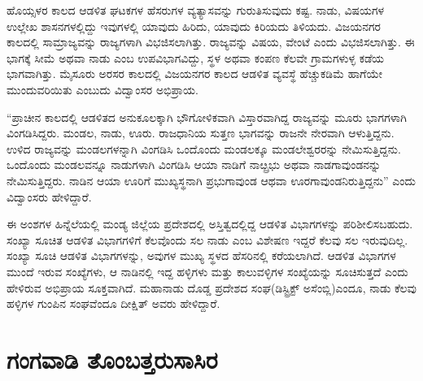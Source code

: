 ಹೊಯ್ಸಳರ ಕಾಲದ ಆಡಳಿತ ಘಟಕಗಳ ಹೆಸರುಗಳ ವ್ಯತ್ಯಾಸವನ್ನು ಗುರುತಿಸುವುದು ಕಷ್ಟ. ನಾಡು, ವಿಷಯಗಳ ಉಲ್ಲೇಖ ಶಾಸನಗಳಲ್ಲಿದ್ದು ಇವುಗಳಲ್ಲಿ ಯಾವುದು ಹಿರಿದು, ಯಾವುದು ಕಿರಿಯದು ತಿಳಿಯದು. ವಿಜಯನಗರ ಕಾಲದಲ್ಲಿ ಸಾಮ್ರಾಜ್ಯವನ್ನು ರಾಜ್ಯಗಳಾಗಿ ವಿಭಜಿಸಲಾಗಿತ್ತು. ರಾಜ್ಯವನ್ನು ವಿಷಯ, ವೇಂಟೆ ಎಂದು ವಿಭಜಿಸಲಾಗಿತ್ತು. ಈ ಭಾಗಕ್ಕೆ ಸೀಮೆ ಅಥವಾ ನಾಡು ಎಂಬ ಉಪವಿಭಾಗವಿದ್ದು, ಸ್ಥಳ ಅಥವಾ ಕಂಪಣ ಕೆಲವೇ ಗ್ರಾಮಗಳುಳ್ಳ ಕಡೆಯ ಭಾಗವಾಗಿತ್ತು. ಮೈಸೂರು ಅರಸರ ಕಾಲದಲ್ಲಿ ವಿಜಯನಗರ ಕಾಲದ ಆಡಳಿತ ವ್ಯವಸ್ಥೆ ಹೆಚ್ಚುಕಡಿಮೆ ಹಾಗೆಯೇ ಮುಂದುವರಿಯಿತು ಎಂಬುದು ವಿದ್ವಾಂಸರ ಅಭಿಪ್ರಾಯ.

“ಪ್ರಾಚೀನ ಕಾಲದಲ್ಲಿ ಆಡಳಿತದ ಅನುಕೂಲಕ್ಕಾಗಿ ಭೌಗೋಳಿಕವಾಗಿ ವಿಸ್ತಾರವಾಗಿದ್ದ ರಾಜ್ಯವನ್ನು ಮೂರು ಭಾಗಗಳಾಗಿ ವಿಂಗಡಿಸಿದ್ದರು. ಮಂಡಲ, ನಾಡು, ಊರು. ರಾಜಧಾನಿಯ ಸುತ್ತಣ ಭಾಗವನ್ನು ರಾಜನೇ ನೇರವಾಗಿ ಆಳುತ್ತಿದ್ದನು. ಉಳಿದ ರಾಜ್ಯವನ್ನು ಮಂಡಲಗಳನ್ನಾಗಿ ವಿಂಗಡಿಸಿ ಒಂದೊಂದು ಮಂಡಲಕ್ಕೂ ಮಂಡಲೇಶ್ವರರನ್ನು ನೇಮಿಸು\-ತ್ತಿದ್ದನು. ಒಂದೊಂದು ಮಂಡಲವನ್ನೂ ನಾಡುಗಳಾಗಿ ವಿಂಗಡಿಸಿ ಆಯಾ ನಾಡಿಗೆ ನಾೞ್ಪ್ರಭು ಅಥವಾ ನಾಡಗಾವುಂಡನನ್ನು ನೇಮಿಸು\-ತ್ತಿದ್ದರು. ನಾಡಿನ ಆಯಾ ಊರಿಗೆ ಮುಖ್ಯಸ್ಥನಾಗಿ ಪ್ರಭುಗಾವುಂಡ ಆಥವಾ ಊರಗಾವುಂಡನಿರುತ್ತಿದ್ದನು” ಎಂದು ವಿದ್ವಾಂಸರು ಹೇಳಿದ್ದಾರೆ.

ಈ ಅಂಶಗಳ ಹಿನ್ನೆಲೆಯಲ್ಲಿ ಮಂಡ್ಯ ಜಿಲ್ಲೆಯ ಪ್ರದೇಶದಲ್ಲಿ ಅಸ್ತಿತ್ವದಲ್ಲಿದ್ದ ಆಡಳಿತ ವಿಭಾಗಗಳನ್ನು ಪರಿಶೀಲಿಸ\-ಬಹುದು. ಸಂಖ್ಯಾ ಸೂಚಿತ ಆಡಳಿತ ವಿಭಾಗಗಳಿಗೆ ಕೆಲವೊಂದು ಸಲ ನಾಡು ಎಂಬ ವಿಶೇಷಣ ಇದ್ದರೆ ಕೆಲವು ಸಲ ಇರುವುದಿಲ್ಲ. ಸಂಖ್ಯಾ ಸೂಚಿ ಆಡಳಿತ ವಿಭಾಗಗಳನ್ನು, ಅವುಗಳ ಮುಖ್ಯ ಸ್ಥಳದ ಹೆಸರಿನಲ್ಲಿ ಕರೆಯಲಾಗಿದೆ. ಆಡಳಿತ ವಿಭಾಗಗಳ ಮುಂದೆ ಇರುವ ಸಂಖ್ಯೆಗಳು, ಆ ನಾಡಿನಲ್ಲಿ ಇದ್ದ ಹಳ್ಳಿಗಳು ಮತ್ತು ಕಾಲುವಳ್ಳಿಗಳ ಸಂಖ್ಯೆಯನ್ನು ಸೂಚಿಸುತ್ತದೆ ಎಂದು ಹೇಳಿರುವ ಅಭಿಪ್ರಾಯ ಸೂಕ್ತವಾಗಿದೆ. ಮಹಾನಾಡು ದೊಡ್ಡ ಪ್ರದೇಶದ ಸಂಘ(ಡಿಸ್ಟ್ರಿಕ್ಟ್​ ಅಸೆಂಬ್ಲಿ)ಎಂದೂ, ನಾಡು ಕೆಲವು ಹಳ್ಳಿಗಳ ಗುಂಪಿನ ಸಂಘವೆಂದೂ ದೀಕ್ಷಿತ್​ ಅವರು ಹೇಳಿದ್ದಾರೆ.

\section*{ಗಂಗವಾಡಿ ತೊಂಬತ್ತರುಸಾಸಿರ}

